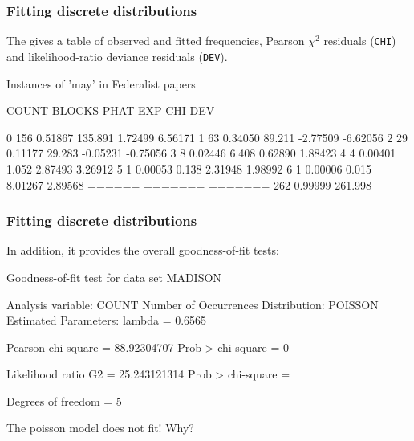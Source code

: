 \begin{frame}[fragile]
\frametitle{Fitting discrete distributions}
The  gives a table of observed and fitted frequencies,
Pearson $\chi^2$ residuals (\texttt{CHI}) and likelihood-ratio deviance 
residuals (\texttt{DEV}).

\begin{Output}[gobble=2,fontsize=\footnotesize]
              Instances of 'may' in Federalist papers
 
   COUNT    BLOCKS      PHAT         EXP       CHI         DEV
 
     0        156     0.51867    135.891     1.72499     6.56171
     1         63     0.34050     89.211    -2.77509    -6.62056
     2         29     0.11177     29.283    -0.05231    -0.75056
     3          8     0.02446      6.408     0.62890     1.88423
     4          4     0.00401      1.052     2.87493     3.26912
     5          1     0.00053      0.138     2.31948     1.98992
     6          1     0.00006      0.015     8.01267     2.89568
            ======    =======    =======
              262     0.99999    261.998
\end{Output}
\end{frame}

\begin{frame}[fragile]
\frametitle{Fitting discrete distributions}
In addition, it provides the overall goodness-of-fit tests:
\begin{Output}[gobble=7]
         Goodness-of-fit test for data set MADISON
 
         Analysis variable:       COUNT Number of Occurrences
         Distribution:            POISSON
         Estimated Parameters:    lambda = 0.6565
 
         Pearson chi-square    = 88.92304707
         Prob > chi-square     = 0
 
         Likelihood ratio G2   = 25.243121314
         Prob > chi-square     = 
 
         Degrees of freedom    = 5
\end{Output}
The poisson model does not fit!  Why?
\end{frame}


